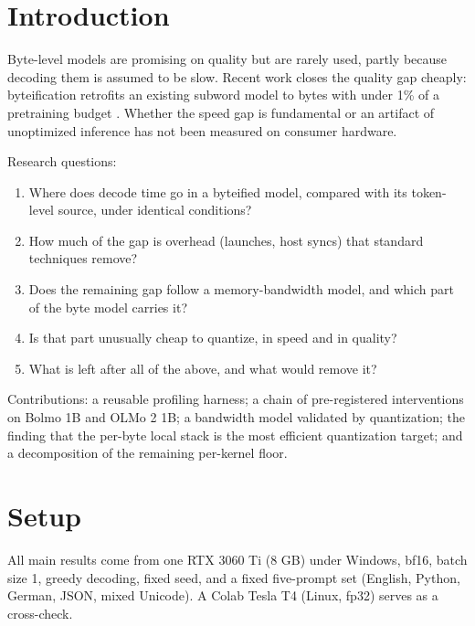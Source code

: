 \documentclass[11pt,a4paper]{article}
\begin{document}
\section{Introduction}\label{introduction}

Byte-level models are promising on quality but are rarely used, partly because decoding them is assumed to be slow. Recent work closes the quality gap cheaply: byteification retrofits an existing subword model to bytes with under 1\% of a pretraining budget \citep{minixhofer2026byteification}. Whether the speed gap is fundamental or an artifact of unoptimized inference has not been measured on consumer hardware.

Research questions:

\begin{enumerate}
\def\labelenumi{\arabic{enumi}.}
\item
  Where does decode time go in a byteified model, compared with its token-level source, under identical conditions?
\item
  How much of the gap is overhead (launches, host syncs) that standard techniques remove?
\item
  Does the remaining gap follow a memory-bandwidth model, and which part of the byte model carries it?
\item
  Is that part unusually cheap to quantize, in speed and in quality?
\item
  What is left after all of the above, and what would remove it?
\end{enumerate}

Contributions: a reusable profiling harness; a chain of pre-registered interventions on Bolmo 1B and OLMo 2 1B; a bandwidth model validated by quantization; the finding that the per-byte local stack is the most efficient quantization target; and a decomposition of the remaining per-kernel floor.

\section{Setup}\label{setup}

All main results come from one RTX 3060 Ti (8 GB) under Windows, bf16, batch size 1, greedy decoding, fixed seed, and a fixed five-prompt set (English, Python, German, JSON, mixed Unicode). A Colab Tesla T4 (Linux, fp32) serves as a cross-check.
\end{document}
